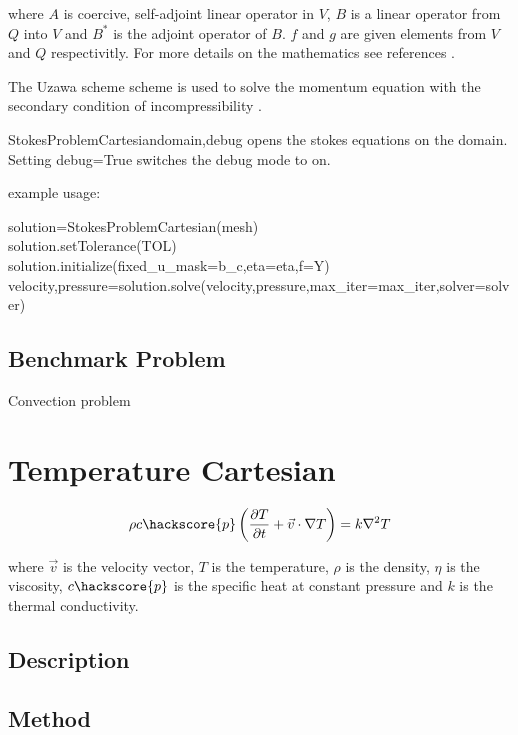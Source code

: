where $A$ is coercive, self-adjoint linear operator in $V$, $B$ is a linear operator from $Q$ into $V$ and $B^{*}$ is the adjoint operator of $B$. $f$ and $g$ are given elements from $V$ and $Q$ respectivitly. For more details on the mathematics see references \cite{AAMIRBERKYAN2008,MBENZI2005}.

The Uzawa scheme scheme is used to solve the momentum equation with the secondary condition of incompressibility \cite{GROSS2006,AAMIRBERKYAN2008}.

\begin{classdesc}{StokesProblemCartesian}{domain,debug}
opens the stokes equations on the \Domain domain. Setting debug=True switches the debug mode to on.
\end{classdesc}

example usage:

solution=StokesProblemCartesian(mesh) \\
solution.setTolerance(TOL) \\
solution.initialize(fixed\_u\_mask=b\_c,eta=eta,f=Y) \\
velocity,pressure=solution.solve(velocity,pressure,max\_iter=max\_iter,solver=solver) \\

\subsection{Benchmark Problem}

Convection problem


\section{Temperature Cartesian}

\begin{equation}
\rho c\hackscore{p} \left (\frac{\partial T}{\partial t} + \vec{v} \cdot \nabla T \right ) = k \nabla^{2}T
\label{HEAT EQUATION}
\end{equation}

where $\vec{v}$ is the velocity vector, $T$ is the temperature, $\rho$ is the density, $\eta$ is the viscosity, $c\hackscore{p}$ is the specific heat at constant pressure and $k$ is the thermal conductivity.

\subsection{Description}

\subsection{Method}

